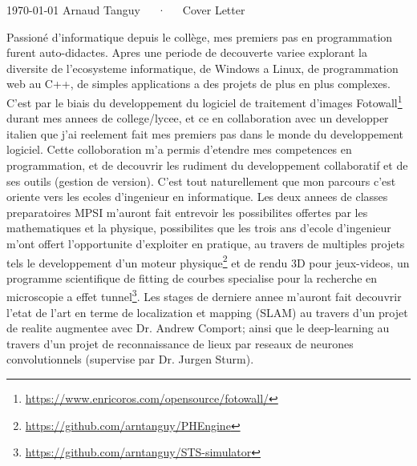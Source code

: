 \documentclass[11pt, a4paper]{awesome-cv}
\begin{document}
\makecvheader[R]

\makecvfooter
  {\today}
  {Arnaud Tanguy~~~·~~~Cover Letter}
  {}

\makelettertitle

\begin{cvletter}

  Passioné d'informatique depuis le collège, mes premiers pas en programmation furent auto-didactes. Apres une periode de decouverte variee explorant la diversite de l'ecosysteme informatique, de Windows a Linux, de programmation web au C++, de simples applications a des projets de plus en plus complexes. C'est par le biais du developpement du logiciel de traitement d'images Fotowall\footnote{\url{https://www.enricoros.com/opensource/fotowall/}} durant mes annees de college/lycee, et ce en collaboration avec un developper italien que j'ai reelement fait mes premiers pas dans le monde du developpement logiciel. Cette colloboration m'a permis d'etendre mes competences en programmation, et de decouvrir les rudiment du developpement collaboratif et de ses outils (gestion de version). C'est tout naturellement que mon parcours c'est oriente vers les ecoles d'ingenieur en informatique. Les deux annees de classes preparatoires MPSI m'auront fait entrevoir les possibilites offertes par les mathematiques et la physique, possibilites que les trois ans d'ecole d'ingenieur m'ont offert l'opportunite d'exploiter en pratique, au travers de multiples projets tels le developpement d'un moteur physique\footnote{\url{https://github.com/arntanguy/PHEngine}} et de rendu 3D pour jeux-videos, un programme scientifique de fitting de courbes specialise pour la recherche en microscopie a effet tunnel\footnote{\url{https://github.com/arntanguy/STS-simulator}}. Les stages de derniere annee m'auront fait decouvrir l'etat de l'art en terme de localization et mapping (SLAM) au travers d'un projet de realite augmentee avec Dr. Andrew Comport; ainsi que le deep-learning au travers d'un projet de reconnaissance de lieux par reseaux de neurones convolutionnels (supervise par Dr. Jurgen Sturm).


\end{cvletter}
\end{document}
